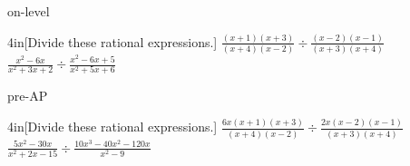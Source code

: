 \begin{taggedblock}{on-level}
    \begin{my2Problems}{4in}[Divide these rational expressions.]
        {
            $
            \frac
            {(x+1)(x+3)}
            {(x+4)(x-2)}
            \div
            \frac
            {(x-2)(x-1)}
            {(x+3)(x+4)}
            $
        }
        {
            $
            \frac
            {x^2 -6x}
            {x^2 + 3x + 2}
            \div
            \frac
            {x^2 - 6x + 5}
            {x^2 + 5x + 6}
            $
        }
    \end{my2Problems}
\end{taggedblock}
\begin{taggedblock}{pre-AP}
    \begin{my2Problems}{4in}[Divide these rational expressions.]
        {
            $
            \frac
            {6x(x+1)(x+3)}
            {(x+4)(x-2)}
            \div
            \frac
            {2x(x-2)(x-1)}
            {(x+3)(x+4)}
            $
        }
        {
            $
            \frac
            {5x^2 -30x}
            {x^2 + 2x - 15}
            \div
            \frac
            {10x^3 - 40x^2 -120x}
            {x^2 - 9}
            $
        }
    \end{my2Problems}
\end{taggedblock}
